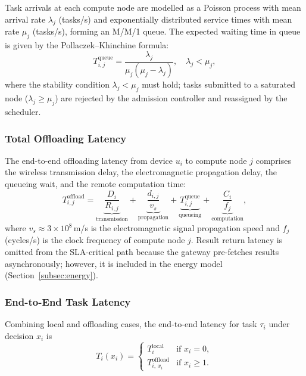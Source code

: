 \documentclass[journal,twoside,letterpaper]{IEEEtran}
\begin{document}
Task arrivals at each compute node are modelled as a Poisson process with
mean arrival rate $\lambda_j$ (tasks/s) and exponentially distributed service
times with mean rate $\mu_j$ (tasks/s), forming an M/M/1 queue.  The
expected waiting time in queue is given by the Pollaczek--Khinchine formula:
\begin{equation}
  T^{\mathrm{queue}}_{i,j} = \frac{\lambda_j}{\mu_j \left(\mu_j - \lambda_j\right)},
  \quad \lambda_j < \mu_j,
  \label{eq:queue_delay}
\end{equation}
where the stability condition $\lambda_j < \mu_j$ must hold; tasks submitted
to a saturated node ($\lambda_j \geq \mu_j$) are rejected by the admission
controller and reassigned by the scheduler.

\subsubsection{Total Offloading Latency}

The end-to-end offloading latency from device $u_i$ to compute node $j$
comprises the wireless transmission delay, the electromagnetic propagation
delay, the queueing wait, and the remote computation time:
\begin{equation}
  T^{\mathrm{offload}}_{i,j} =
    \underbrace{\frac{D_i}{R_{i,j}}}_{\text{transmission}}
    + \underbrace{\frac{d_{i,j}}{v_s}}_{\text{propagation}}
    + \underbrace{T^{\mathrm{queue}}_{i,j}}_{\text{queueing}}
    + \underbrace{\frac{C_i}{f_j}}_{\text{computation}},
  \label{eq:latency_offload}
\end{equation}
where $v_s \approx 3 \times 10^8$\,m/s is the electromagnetic signal
propagation speed and $f_j$ (cycles/s) is the clock frequency of compute
node $j$.  Result return latency is omitted from the SLA-critical path
because the gateway pre-fetches results asynchronously; however, it is
included in the energy model (Section~\ref{subsec:energy}).

\subsubsection{End-to-End Task Latency}

Combining local and offloading cases, the end-to-end latency for task
$\tau_i$ under decision $x_i$ is
\begin{equation}
  T_i(x_i) =
  \begin{cases}
    T^{\mathrm{local}}_i                   & \text{if } x_i = 0, \\[4pt]
    T^{\mathrm{offload}}_{i,\, x_i}       & \text{if } x_i \geq 1.
  \end{cases}
  \label{eq:latency_total}
\end{equation}
\end{document}
